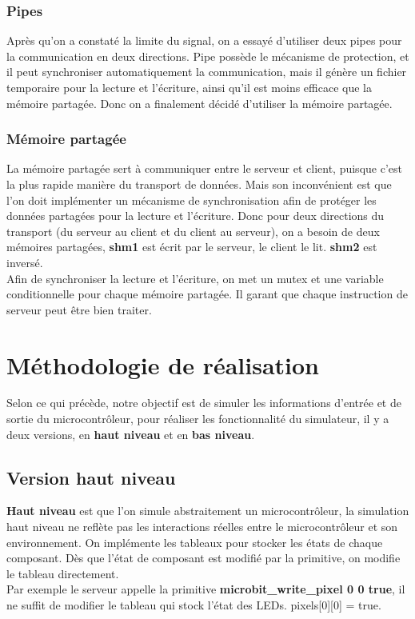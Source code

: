 \documentclass[14px]{article}
\begin{document}
	\subsubsection{Pipes}
	Après qu'on a constaté la limite du signal, on a essayé d'utiliser deux pipes pour la communication en deux directions. Pipe possède le mécanisme de protection, et il peut synchroniser automatiquement la communication, mais il 	génère un fichier temporaire pour la lecture et l'écriture, ainsi qu’il est moins efficace que la mémoire partagée. Donc on a finalement décidé d'utiliser la mémoire partagée.

	\subsubsection{Mémoire partagée}
	La mémoire partagée sert à communiquer entre le serveur et client, puisque c'est la plus rapide manière du transport de données. Mais son inconvénient est que l'on doit implémenter un mécanisme de synchronisation afin de protéger les données partagées pour la lecture et l'écriture. Donc pour deux directions du transport (du serveur au client et du client au serveur), on a besoin de deux mémoires partagées, \textbf{shm1} est écrit par le serveur, le client le lit. \textbf{shm2} est inversé.\\

	Afin de synchroniser la lecture et l'écriture, on met un mutex et une variable conditionnelle pour chaque mémoire partagée. Il garant que chaque instruction de serveur peut être bien traiter.\\




	\clearpage
	\pagestyle{fancy}
	\rhead{\thepage}
	\fancyfoot{}

	\section{Méthodologie de réalisation}
	Selon ce qui précède, notre objectif est de simuler les informations d'entrée et de sortie du microcontrôleur, pour réaliser les fonctionnalité du simulateur, il y a deux versions, en \textbf{haut niveau} et en \textbf{bas niveau}.

	\subsection{Version haut niveau}
	\textbf{Haut niveau} est que l'on simule abstraitement un microcontrôleur, la simulation haut niveau ne reflète pas les interactions réelles entre le microcontrôleur et son environnement. On implémente les tableaux pour stocker les états de chaque composant. Dès que l'état de composant est modifié par la primitive, on modifie le tableau directement.\\
	Par exemple le serveur appelle la primitive \textbf{microbit\_write\_pixel 0 0 true}, il ne suffit de modifier le tableau qui stock l'état des LEDs. pixels[0][0] = true.\\
\end{document}
